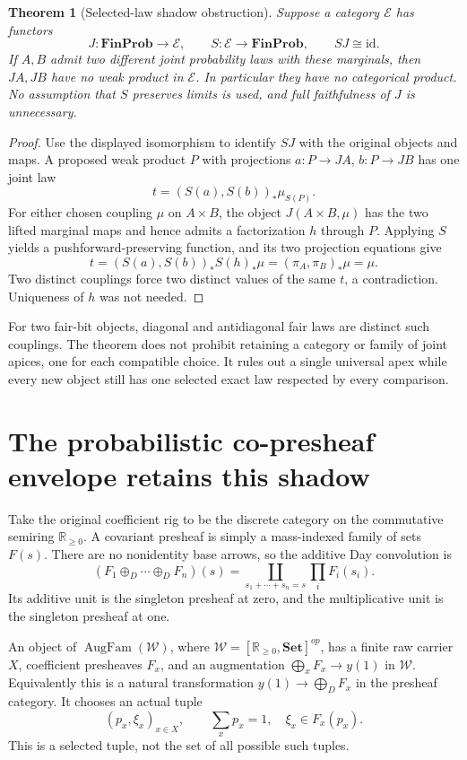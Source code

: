 \documentclass[11pt]{article}
\newtheorem{theorem}{Theorem}
\newcommand{\W}{\mathcal W}
\newcommand{\Aug}{\operatorname{AugFam}}
\begin{document}
\begin{theorem}[Selected-law shadow obstruction]
Suppose a category $\mathcal E$ has functors
\[
 J:\mathbf{FinProb}\longrightarrow\mathcal E,
 \qquad S:\mathcal E\longrightarrow\mathbf{FinProb},
 \qquad SJ\cong\mathrm{id}.
\]
If $A,B$ admit two different joint probability laws with these marginals, then $JA,JB$ have no weak product in $\mathcal E$. In particular they have no categorical product. No assumption that $S$ preserves limits is used, and full faithfulness of $J$ is unnecessary.
\end{theorem}
\begin{proof}
Use the displayed isomorphism to identify $SJ$ with the original objects and maps. A proposed weak product $P$ with projections $a:P\to JA$, $b:P\to JB$ has one joint law
\[
 t=(S(a),S(b))_*\mu_{S(P)}.
\]
For either chosen coupling $\mu$ on $A\times B$, the object $J(A\times B,\mu)$ has the two lifted marginal maps and hence admits a factorization $h$ through $P$. Applying $S$ yields a pushforward-preserving function, and its two projection equations give
\[
 t=(S(a),S(b))_*S(h)_*\mu=(\pi_A,\pi_B)_*\mu=\mu.
\]
Two distinct couplings force two distinct values of the same $t$, a contradiction. Uniqueness of $h$ was not needed.
\end{proof}
For two fair-bit objects, diagonal and antidiagonal fair laws are distinct such couplings. The theorem does not prohibit retaining a category or family of joint apices, one for each compatible choice. It rules out a single universal apex while every new object still has one selected exact law respected by every comparison.

\section{The probabilistic co-presheaf envelope retains this shadow}
Take the original coefficient rig to be the discrete category on the commutative semiring $\mathbb R_{\ge0}$. A covariant presheaf is simply a mass-indexed family of sets $F(s)$. There are no nonidentity base arrows, so the additive Day convolution is
\[
 (F_1\oplus_D\cdots\oplus_DF_n)(s)
 =\coprod_{s_1+\cdots+s_n=s}\prod_iF_i(s_i).
\]
Its additive unit is the singleton presheaf at zero, and the multiplicative unit is the singleton presheaf at one.

An object of $\Aug(\W)$, where $\W=[\mathbb R_{\ge0},\mathbf{Set}]^{op}$, has a finite raw carrier $X$, coefficient presheaves $F_x$, and an augmentation $\bigoplus_xF_x\to y(1)$ in $\W$. Equivalently this is a natural transformation $y(1)\to\bigoplus_DF_x$ in the presheaf category. It chooses an actual tuple
\[
 (p_x,\xi_x)_{x\in X},\qquad \sum_xp_x=1,\quad \xi_x\in F_x(p_x).
\]
This is a selected tuple, not the set of all possible such tuples.
\end{document}
